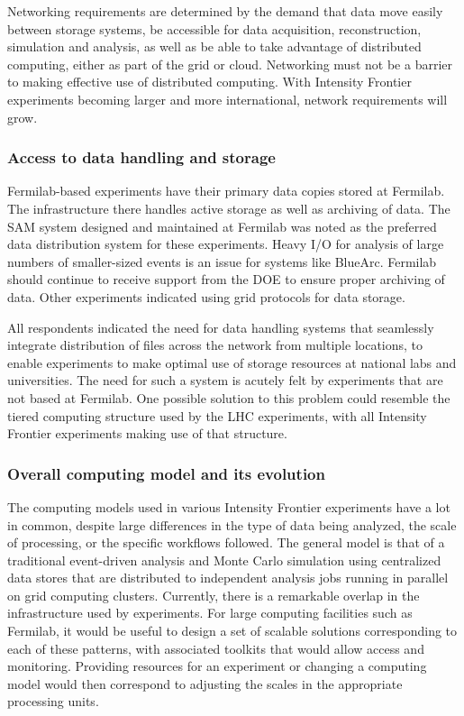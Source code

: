 Networking requirements are determined by the demand that data move easily between storage systems,
be accessible for data acquisition, reconstruction, simulation and analysis,
as well as be able to take advantage of distributed computing,
either as part of the grid or cloud.  Networking must not be a barrier to
making effective use of distributed computing. With Intensity Frontier experiments becoming
larger and more international, network requirements will grow.

\subsubsection{Access to data handling and storage}
Fermilab-based experiments have
their primary data copies stored at Fermilab.  The infrastructure there
handles active storage as well as archiving of data.  The SAM system designed
and maintained at Fermilab was noted as the preferred data distribution system
for these experiments. Heavy I/O for analysis of large numbers of smaller-sized
events is an issue for systems like BlueArc. Fermilab should continue to
receive support from the DOE to ensure proper archiving of data. Other
experiments indicated using grid protocols for data storage.

All respondents indicated the need for data handling systems that seamlessly
integrate distribution of files across the network from multiple locations, to
enable experiments to make optimal use of storage resources at national labs
and universities.  The need for such a system is acutely felt by experiments
that are not based at Fermilab.  One possible solution to this problem could
resemble the tiered computing structure used by the LHC experiments, with all
Intensity Frontier experiments making use of that structure.


\subsubsection{Overall computing model and its evolution}
The computing models used in various 
Intensity Frontier experiments have a lot in common, despite large differences in
the type of data being analyzed, the scale of processing, or the specific
workflows followed.   The general model is that of a traditional event-driven
analysis and Monte Carlo simulation using centralized data stores that are
distributed to independent analysis jobs running in parallel on grid computing
clusters.  Currently, there is a remarkable overlap
in the infrastructure used by experiments. For large computing facilities such
as Fermilab, it would be useful to design a set of scalable solutions
corresponding to each of these patterns, with associated toolkits that would
allow access and monitoring. Providing resources for an experiment or changing a
computing model would then correspond to adjusting the scales in the
appropriate processing units.

